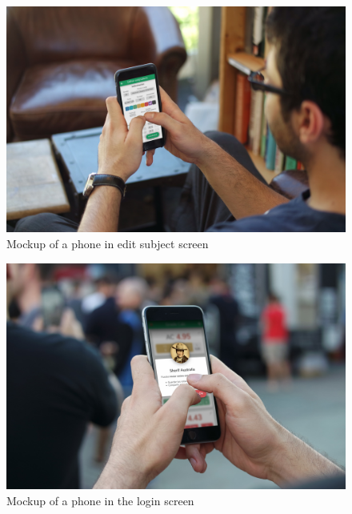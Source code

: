\begin{figure}[ht!]
    \center
    \includegraphics[width=0.85\columnwidth]{media/mockups/mockup-phone-edit.jpg}
    \caption{Mockup of a phone in edit subject screen}
    \label{fig:mockup-phone-home}
\end{figure}
\vfill
\begin{figure}[ht!]
    \center
    \includegraphics[width=0.85\columnwidth]{media/mockups/mockup-phone-login.jpg}
    \caption{Mockup of a phone in the login screen}
    \label{fig:mockup-phone-login}
\end{figure}

\clearpage\newpage

